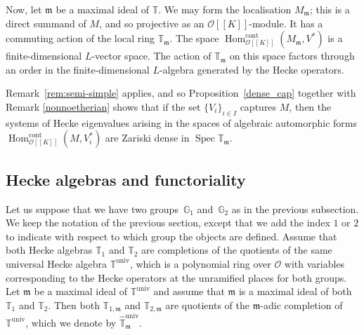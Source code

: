 \documentclass[JEP,XML,SOM,Unicode,NoEqCountersInSection]{cedram}
\let\mathcal\mathscr
\theoremstyle{definition}
\DeclareMathOperator{\Hom}{Hom}
\DeclareMathOperator{\Spec}{Spec}
\newcommand{\br}[1]{[\![#1]\!]}
\newcommand{\mm}{\mathfrak m}
\newcommand{\cO}{\mathcal{O}}
\newcommand{\cont}{\mathrm{cont}}
\newcommand{\univ}{\mathrm{univ}}
\begin{document}
Now, let $\mathfrak m$ be a maximal ideal of $\mathbb T$.
We may form the localisation $M_{\mathfrak m}$; this is a direct
summand of $M$, and so projective as an $\mathcal O\br{K}$-module.
It has a commuting action of the local ring $\mathbb T_{\mathfrak m}$.
The space $\Hom_{\mathcal O\br{K}}^{\cont}(M_{\mathfrak m},V^*)$
is a finite-dimensional $L$\nobreakdash-vector space.
The action of $\mathbb T_{\mathfrak m}$ on this space
factors through an order in the finite-dimensional $L$-algebra
generated by the Hecke operators.

Remark~\ref{rem:semi-simple} applies, and so Proposition~\ref{dense_cap} together with Remark \ref{nonnoetherian}
shows that if the set $\{V_i\}_{i \in I}$ captures $M$,
then the systems of Hecke eigenvalues arising
in the spaces of algebraic automorphic forms
$\Hom_{\mathcal O\br{K}}^{\cont}(M,V_i^*)$
are Zariski dense in $\Spec \mathbb T_{\mathfrak m}$.

\subsection{Hecke algebras and functoriality} Let us suppose that we have two groups~$\mathbb G_1$ and~$\mathbb G_2$ as in the previous
subsection. We keep the notation of the previous section,
except that we add the index $1$ or $2$ to indicate with respect to which group the objects are defined. Assume that both Hecke algebras $\mathbb T_1$ and $\mathbb T_2$ are completions of the quotients
of the same universal Hecke algebra $\mathbb T^{\univ}$, which is a polynomial ring over
$\cO$ with variables corresponding to the Hecke operators at the unramified places for both groups.
Let $\mm$ be a maximal ideal of $\mathbb T^{\univ}$ and assume that $\mm$ is a maximal ideal of both $\mathbb T_1$ and $\mathbb T_2$. Then both $\mathbb T_{1,\mm}$ and $\mathbb T_{2,\mm}$ are quotients of the $\mm$-adic completion of $\mathbb T^{\univ}$, which we denote by $\widehat{\mathbb T}^{\univ}_{\mm}$.
\end{document}
